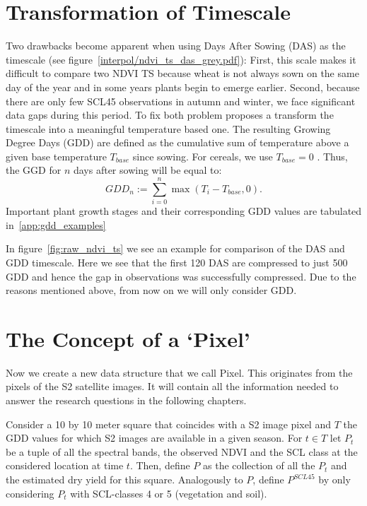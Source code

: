 \section{Transformation of Timescale}\label{sec:gdd_def}
	{%
		Two drawbacks become apparent when using Days After Sowing (DAS) as the timescale (see figure~\ref{interpol/ndvi_ts_das_grey.pdf}): First, this scale makes it difficult to compare two NDVI {TS} because wheat is not always sown on the same day of the year and in some years plants begin to emerge earlier. Second, because there are only few SCL45 observations in autumn and winter, we face significant data gaps during this period. To fix both problem \cite{mcmasterGrowingDegreedaysOne1997} proposes a transform the timescale into a meaningful temperature based one. The resulting Growing Degree Days ({GDD}) are defined as the cumulative sum of temperature above a given base temperature $T_{base}$ since sowing. For cereals, we use $T_{base}=0$ \citep{holzkamperSpatialTemporalTrends2015}. Thus, the GGD for $n$ days after sowing will be equal to:
		\begin{equation}
			\label{eq:gdd}
			GDD_n := \sum_{i=0}^n \max(T_i - T_{base}, 0).
		\end{equation}
		Important plant growth stages and their corresponding GDD values are tabulated in~\ref{app:gdd_examples}

		In figure~\ref{fig:raw_ndvi_ts} we see an example for comparison of the DAS and GDD timescale. Here we see that the first 120 DAS are compressed to just 500 GDD and hence the gap in observations was successfully compressed. Due to the reasons mentioned above, from now on we will only consider GDD.
	} 

\section{The Concept of a `Pixel'}{ \label{sec:gather_data_to_pixel}
	Now we create a new data structure that we call Pixel. This originates from the pixels of the S2 satellite images. It will contain all the information needed to answer the research questions in the following chapters. 
		
		Consider a 10 by 10 meter square that coincides with a S2 image pixel and $T$ the GDD values for which S2 images are available in a given season. For $t\in T$ let $P_t$ be a tuple of all the spectral bands, the observed NDVI and the SCL class at the considered location at time $t$. Then, define $P$ as the collection of all the $P_t$ and the estimated dry yield for this square.
		Analogously to $P$, define $P^{SCL45}$ by only considering $P_t$ with SCL-classes 4 or 5 (vegetation and soil).  
}

